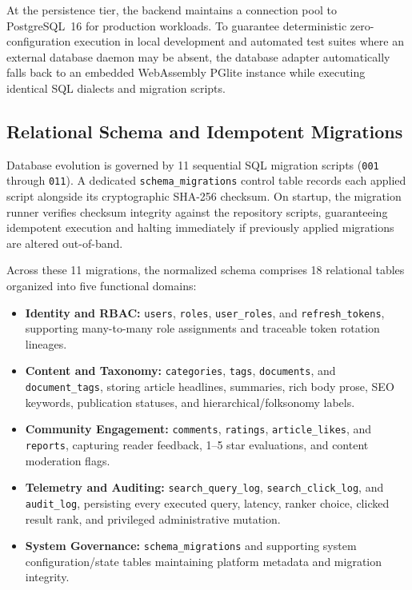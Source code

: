 \documentclass[conference]{IEEEtran}
\begin{document}
At the persistence tier, the backend maintains a connection pool to PostgreSQL~16 for production workloads. To guarantee deterministic zero-configuration execution in local development and automated test suites where an external database daemon may be absent, the database adapter automatically falls back to an embedded WebAssembly PGlite instance while executing identical SQL dialects and migration scripts.

\subsection{Relational Schema and Idempotent Migrations}
Database evolution is governed by 11 sequential SQL migration scripts (\texttt{001} through \texttt{011}). A dedicated \texttt{schema\_migrations} control table records each applied script alongside its cryptographic SHA-256 checksum. On startup, the migration runner verifies checksum integrity against the repository scripts, guaranteeing idempotent execution and halting immediately if previously applied migrations are altered out-of-band.

Across these 11 migrations, the normalized schema comprises 18 relational tables organized into five functional domains:
\begin{itemize}
\item \textbf{Identity and RBAC:} \texttt{users}, \texttt{roles}, \texttt{user\_roles}, and \texttt{refresh\_tokens}, supporting many-to-many role assignments and traceable token rotation lineages.
\item \textbf{Content and Taxonomy:} \texttt{categories}, \texttt{tags}, \texttt{documents}, and \texttt{document\_tags}, storing article headlines, summaries, rich body prose, SEO keywords, publication statuses, and hierarchical/folksonomy labels.
\item \textbf{Community Engagement:} \texttt{comments}, \texttt{ratings}, \texttt{article\_likes}, and \texttt{reports}, capturing reader feedback, 1--5 star evaluations, and content moderation flags.
\item \textbf{Telemetry and Auditing:} \texttt{search\_query\_log}, \texttt{search\_click\_log}, and \texttt{audit\_log}, persisting every executed query, latency, ranker choice, clicked result rank, and privileged administrative mutation.
\item \textbf{System Governance:} \texttt{schema\_migrations} and supporting system configuration/state tables maintaining platform metadata and migration integrity.
\end{itemize}
\end{document}
